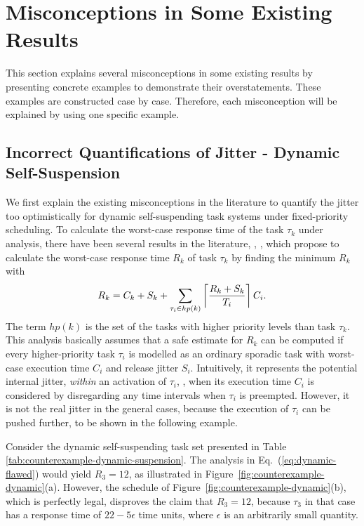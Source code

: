 
\section{Misconceptions in Some Existing Results}
\label{sec:misconceptions}

This section explains several misconceptions in some existing results by presenting concrete examples to demonstrate their overstatements. These examples are constructed case by case. Therefore, each misconception will be explained by using one specific example. 

\subsection{Incorrect Quantifications of Jitter - Dynamic Self-Suspension}
\label{sec:wrong-jitter-dynamic}

We first explain the existing misconceptions in the literature to quantify the jitter too optimistically for dynamic self-suspending task systems under fixed-priority scheduling. To calculate the worst-case response time of the task $\tau_k$ under analysis, there have been several results in the literature, \ie, \cite{ECRTS-AudsleyB04,RTAS-AudsleyB04,RTCSA-KimCPKH95,MingLiRTCSA1994},  which propose to calculate the worst-case response time $R_k$ of task $\tau_k$ by finding the minimum $R_k$ with
\begin{equation}
R_k = C_k+ S_k+\sum_{\tau_i \in hp(k)}\left\lceil{\frac{R_k+S_k}{T_i}}\right\rceil C_i.
\label{eq:dynamic-flawed}
\end{equation}
The term $hp(k)$ is the set of the tasks with higher priority levels than task $\tau_k$. 
This analysis basically assumes that a safe estimate for $R_k$ can be computed if
every higher-priority task $\tau_i$ is modelled as an ordinary sporadic
task with worst-case execution time $C_i$ and release jitter $S_i$.
Intuitively, it represents the potential internal jitter, \textit{within} an activation of $\tau_i$, \ie, when its execution time $C_i$ is considered by disregarding any time intervals when $\tau_i$ is preempted. 
However, it is not the real jitter in the general cases, because the execution of $\tau_i$ can be pushed further, to be shown in the following example.


Consider the dynamic self-suspending task set presented in Table \ref{tab:counterexample-dynamic-suspension}. 
The analysis in Eq.~(\ref{eq:dynamic-flawed}) would yield $R_3=12$, as illustrated in 
Figure~\ref{fig:counterexample-dynamic}(a). However, the schedule of Figure~\ref{fig:counterexample-dynamic}(b), which is perfectly legal, 
disproves the claim that $R_3=12$, because $\tau_3$ in that case has a response time of $22-5\epsilon$ time units, 
where $\epsilon$ is an arbitrarily small quantity. 

